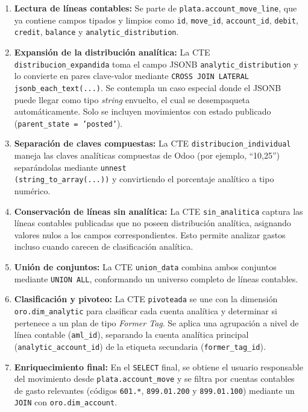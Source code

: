 \begin{enumerate}
    \item \textbf{Lectura de líneas contables:} Se parte de \texttt{plata.account\_move\_line}, que ya contiene campos tipados y limpios como \texttt{id}, \texttt{move\_id}, \texttt{account\_id}, \texttt{debit}, \texttt{credit}, \texttt{balance} y \texttt{analytic\_distribution}.

    \item \textbf{Expansión de la distribución analítica:} La CTE \texttt{distribucion\_expandida} toma el campo JSONB \texttt{analytic\_distribution} y lo convierte en pares clave-valor mediante \texttt{CROSS JOIN LATERAL jsonb\_each\_text(...)}. Se contempla un caso especial donde el JSONB puede llegar como tipo \textit{string} envuelto, el cual se desempaqueta automáticamente. Solo se incluyen movimientos con estado publicado (\texttt{parent\_state = 'posted'}).

    \item \textbf{Separación de claves compuestas:} La CTE \texttt{distribucion\_individual} maneja las claves analíticas compuestas de Odoo (por ejemplo, ``10,25'') separándolas mediante \texttt{unnest\\(string\_to\_array(...))} y convirtiendo el porcentaje analítico a tipo numérico.

    \item \textbf{Conservación de líneas sin analítica:} La CTE \texttt{sin\_analitica} captura las líneas contables publicadas que no poseen distribución analítica, asignando valores nulos a los campos correspondientes. Esto permite analizar gastos incluso cuando carecen de clasificación analítica.

    \item \textbf{Unión de conjuntos:} La CTE \texttt{union\_data} combina ambos conjuntos mediante \texttt{UNION ALL}, conformando un universo completo de líneas contables.

    \item \textbf{Clasificación y pivoteo:} La CTE \texttt{pivoteada} se une con la dimensión \texttt{oro.dim\_analytic} para clasificar cada cuenta analítica y determinar si pertenece a un plan de tipo \textit{Former Tag}. Se aplica una agrupación a nivel de línea contable (\texttt{aml\_id}), separando la cuenta analítica principal (\texttt{analytic\_account\_id}) de la etiqueta secundaria (\texttt{former\_tag\_id}).

    \item \textbf{Enriquecimiento final:} En el \texttt{SELECT} final, se obtiene el usuario responsable del movimiento desde \texttt{plata.account\_move} y se filtra por cuentas contables de gasto relevantes (códigos \texttt{601.*}, \texttt{899.01.200} y \texttt{899.01.100}) mediante un \texttt{JOIN} con \texttt{oro.dim\_account}.
\end{enumerate}

